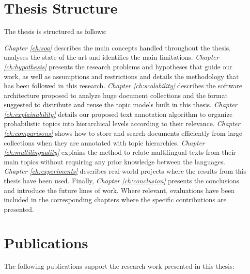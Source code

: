 \section{Thesis Structure}

The thesis is structured as follows:

\textit{Chapter \ref{ch:soa}} describes the main concepts handled throughout the thesis, analyses the state of the art and identifies the main limitations. \textit{Chapter \ref{ch:hypothesis}} presents the research problems and hypotheses that guide our work, as well as assumptions and restrictions and details the methodology that has been followed in this research. \textit{Chapter \ref{ch:scalability}} describes the software architecture proposed to analyze huge document collections and the format suggested to distribute and reuse the topic models built in this thesis. \textit{Chapter \ref{ch:explainability}} details our proposed text annotation algorithm to organize probabilistic topics into hierarchical levels according to their relevance. \textit{Chapter \ref{ch:comparisons}} shows how to store and search documents efficiently from large collections when they are annotated with topic hierarchies.  \textit{Chapter \ref{ch:multilinguality}} explains the method to relate multilingual texts from their main topics without requiring any prior knowledge between the languages. \textit{Chapter \ref{ch:experiments}} describes real-world projects where the results from this thesis have been used. Finally, \textit{Chapter \ref{ch:conclusion}} presents the conclusions and introduce the future lines of work. Where relevant, evaluations have been included in the corresponding chapters where the specific contributions are presented.


\section{Publications}

The following publications support the research work presented in this thesis:


